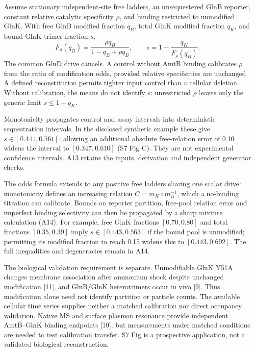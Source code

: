 \documentclass[11pt]{article}
\begin{document}
Assume stationary independent-site free ladders, an unsequestered GlnB reporter, constant relative catalytic specificity $\rho$, and binding restricted to unmodified GlnK. With free GlnB modified fraction $q_B$, total GlnK modified fraction $q_K$, and bound GlnK trimer fraction $s$,
\[
 F_\rho(q_B)=\frac{\rho q_B}{1-q_B+\rho q_B},\qquad
 s=1-\frac{q_K}{F_\rho(q_B)}.
\]
The common GlnD drive cancels. A control without AmtB binding calibrates $\rho$ from the ratio of modification odds, provided relative specificities are unchanged. A defined reconstitution permits tighter input control than a cellular deletion. Without calibration, the means do not identify $s$: unrestricted $\rho$ leaves only the generic limit $s\leq1-q_K$.

Monotonicity propagates control and assay intervals into deterministic sequestration intervals. In the disclosed synthetic example these give $s\in[0.441,0.561]$; allowing an additional absolute free-relation error of 0.10 widens the interval to $[0.347,0.610]$ (S7 Fig C). They are not experimental confidence intervals. A13 retains the inputs, derivation and independent generator checks.



The odds formula extends to any positive free ladders sharing one scalar drive: monotonicity defines an increasing relation $C=m_K\circ m_B^{-1}$, which a no-binding titration can calibrate. Bounds on reporter partition, free-pool relation error and imperfect binding selectivity can then be propagated by a sharp mixture calculation (A14). For example, free GlnK fractions $[0.70,0.80]$ and total fractions $[0.35,0.39]$ imply $s\in[0.443,0.563]$ if the bound pool is unmodified; permitting its modified fraction to reach 0.15 widens this to $[0.443,0.692]$. The full inequalities and degeneracies remain in A14.

The biological validation requirement is separate. Unmodifiable GlnK Y51A changes membrane association after ammonium shock despite unchanged modification [11], and GlnB/GlnK heterotrimers occur in vivo [9]. Thus modification alone need not identify partition or particle counts. The available cellular time series supplies neither a matched calibration nor direct occupancy validation. Native MS and surface plasmon resonance provide independent AmtB--GlnK binding endpoints [10], but measurements under matched conditions are needed to test calibration transfer. S7 Fig is a prospective application, not a validated biological reconstruction.
\end{document}
